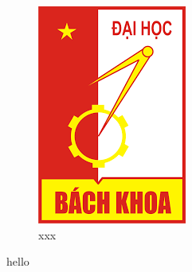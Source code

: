 \lipsum[1]

\begin{figure}[H]
\centering
\includegraphics[scale = 0.4]{pictures/HUST.png}
\caption{xxx}
\end{figure}




hello \cite{key_article}